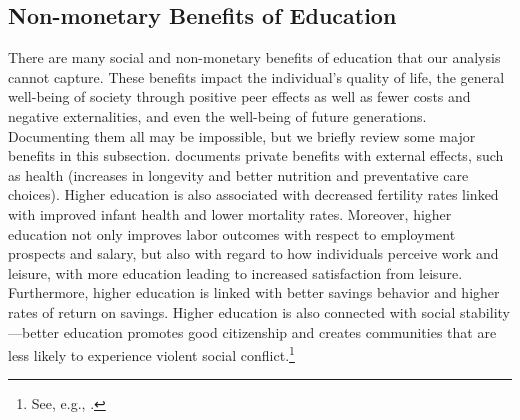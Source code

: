 \subsection{Non-monetary Benefits of Education}

\noindent There are many social and non-monetary benefits of education that our analysis cannot capture. These benefits impact the individual's quality of life, the general well-being of society through positive peer effects as well as fewer costs and negative externalities, and even the well-being of future generations. Documenting them all may be impossible, but we briefly review some major benefits in this subsection. \cite{Vila_2000_Non-Monetary-Benefits-Education} documents private benefits with external effects, such as health (increases in longevity and better nutrition and preventative care choices). Higher education is also associated with decreased fertility rates linked with improved infant health and lower mortality rates. Moreover, higher education not only improves labor outcomes with respect to employment prospects and salary, but also with regard to how individuals perceive work and leisure, with more education leading to increased satisfaction from leisure. Furthermore, higher education is linked with better savings behavior and higher rates of return on savings. Higher education is also connected with social stability---better education promotes good citizenship and creates communities that are less likely to experience violent social conflict.\footnote{See, e.g., \citet{Lochner_2011_NBER,Lochner_2011_Handbook}.} 